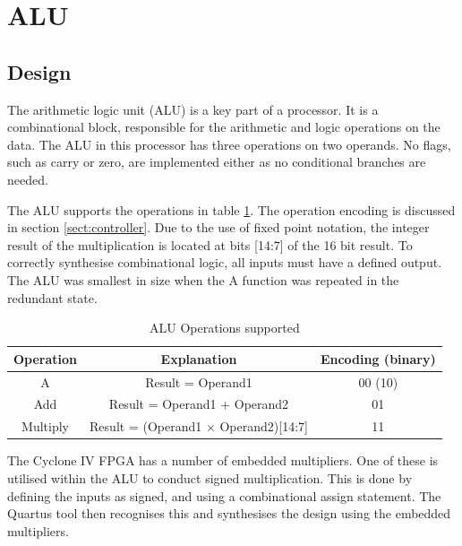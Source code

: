 

\section{ALU}

\subsection{Design}
The arithmetic logic unit (ALU) is a key part of a processor. 
It is a combinational block, responsible for the arithmetic and logic operations on the data.
The ALU in this processor has three operations on two operands.
No flags, such as carry or zero, are implemented either as no conditional branches are needed.

The ALU supports the operations in table \ref{tab:aluops}.
The operation encoding is discussed in section \ref{sect:controller}.
Due to the use of fixed point notation, the integer result of the multiplication is located at bits [14:7] of the 16 bit result.
To correctly synthesise combinational logic, all inputs must have a defined output.
The ALU was smallest in size when the A function was repeated in the redundant state.

\begin{table}
\caption{ALU Operations supported}
\label{tab:aluops}
\begin{tabular}{ccc} \toprule
Operation & Explanation & Encoding (binary)\\  \midrule
A & Result = Operand1 & 00 (10) \\
Add & Result = Operand1 + Operand2 & 01 \\
Multiply & Result = (Operand1 $\times$ Operand2)[14:7] & 11 \\ \bottomrule
\end{tabular}
\end{table}


The Cyclone IV FPGA has a number of embedded multipliers. 
One of these is utilised within the ALU to conduct signed multiplication. 
This is done by defining the inputs as signed, and using a combinational assign statement.
The Quartus tool then recognises this and synthesises the design using the embedded multipliers.



